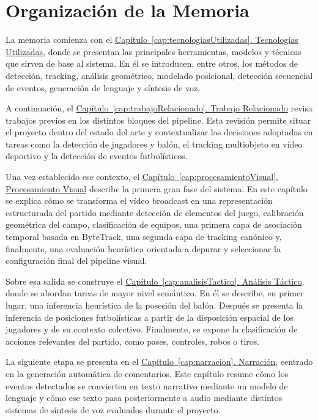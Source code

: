 \section{Organización de la Memoria}

La memoria comienza con el \hyperref[cap:tecnologiasUtilizadas]{Capítulo~\ref*{cap:tecnologiasUtilizadas}. Tecnologías Utilizadas}, donde se presentan las principales herramientas, modelos y técnicas que sirven de base al sistema. En él se introducen, entre otros, los métodos de detección, tracking, análisis geométrico, modelado posicional, detección secuencial de eventos, generación de lenguaje y síntesis de voz.

A continuación, el \hyperref[cap:trabajoRelacionado]{Capítulo~\ref*{cap:trabajoRelacionado}. Trabajo Relacionado} revisa trabajos previos en los distintos bloques del pipeline. Esta revisión permite situar el proyecto dentro del estado del arte y contextualizar las decisiones adoptadas en tareas como la detección de jugadores y balón, el tracking multiobjeto en vídeo deportivo y la detección de eventos futbolísticos.

Una vez establecido ese contexto, el \hyperref[cap:procesamientoVisual]{Capítulo~\ref*{cap:procesamientoVisual}. Procesamiento Visual} describe la primera gran fase del sistema. En este capítulo se explica cómo se transforma el vídeo broadcast en una representación estructurada del partido mediante detección de elementos del juego, calibración geométrica del campo, clasificación de equipos, una primera capa de asociación temporal basada en ByteTrack, una segunda capa de tracking canónico y, finalmente, una evaluación heurística orientada a depurar y seleccionar la configuración final del pipeline visual.

Sobre esa salida se construye el \hyperref[cap:analisisTactico]{Capítulo~\ref*{cap:analisisTactico}. Análisis Táctico}, donde se abordan tareas de mayor nivel semántico. En él se describe, en primer lugar, una inferencia heurística de la posesión del balón. Después se presenta la inferencia de posiciones futbolísticas a partir de la disposición espacial de los jugadores y de su contexto colectivo. Finalmente, se expone la clasificación de acciones relevantes del partido, como pases, controles, robos o tiros.

La siguiente etapa se presenta en el \hyperref[cap:narracion]{Capítulo~\ref*{cap:narracion}. Narración}, centrado en la generación automática de comentarios. Este capítulo resume cómo los eventos detectados se convierten en texto narrativo mediante un modelo de lenguaje y cómo ese texto pasa posteriormente a audio mediante distintos sistemas de síntesis de voz evaluados durante el proyecto.

